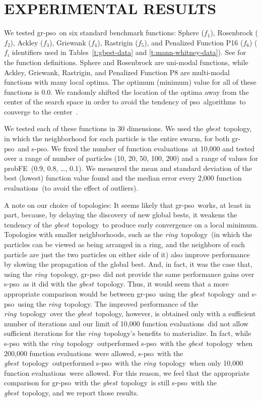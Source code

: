 \documentclass[a4paper,twoside]{article}
\newcommand{\fncevals}{function evaluations}
\newcommand{\fes}{function evaluations}
\newcommand{\pfe}{{probFE}}
\newcommand{\pso}{{\sc pso}}
\newcommand{\spso}{{\sc s-pso}}
\newcommand{\cfe}{{\sc gr-pso}}
\newcommand{\algs}{algorithms}
\newcommand{\gbn}{\emph{gbest}}
\newcommand{\ring}{\emph{ring}}
\newcommand{\topo}{topology}
\begin{document}
\section{\uppercase{Experimental Results}}
\label{s:experiments}

We tested \cfe\ on six standard benchmark functions: Sphere ($f_1$), Rosenbrock ($f_2$), Ackley ($f_3$), Griewank ($f_4$), Rastrigin ($f_5$), and Penalized Function P16 ($f_6$) ($f_i$ identifiers used in Tables~\ref{t:gbest-data} and \ref{t:mann-whitney-data}).  See \cite{bratton07} for the function definitions.
 Sphere and Rosenbrock are uni-modal functions, while Ackley, Griewank, Rastrigin, and Penalized Function P8 are multi-modal functions with many local optima. The optimum (minimum) value for all of these functions is 0.0.
 We randomly shifted the location of the optima away from the center of the search space in order 
to avoid the tendency of \pso\ \algs\ to converge to the center~\cite{monson05}.


We tested each of these functions in 30 dimensions.  We used the \gbn\ \topo, in which the neighborhood for each particle is the entire swarm, for both \cfe\ and \spso. We fixed the number of \fncevals\ at 10,000 and tested over a range of number of particles (10, 20, 50, 100, 200) and a range of values for \pfe\ (0.9, 0.8, \ldots, 0.1).  We measured the mean and standard deviation of the best (lowest) function value found and the median error every 2,000 \fes\ (to avoid the effect of outliers). 

A note on our choice of topologies:  It seems likely that \cfe\ works, at least in part, because, by delaying the discovery of new global bests, it weakens the tendency of the \gbn\ \topo\ to produce early convergence on a local minimum. Topologies with smaller neighborhoods, such as the \ring\ \topo\ (in which the particles can be viewed as being arranged in a ring, and the neighbors of each particle are just the two particles on either side of it) also improve performance by slowing the propagation of the global best. 
And, in fact, it was the case that, using the \ring\ \topo, \cfe\ did not provide the same performance gains over \spso\ as it did with the \gbn\ \topo.  Thus, it would seem that a more appropriate comparison would be between \cfe\ using the \gbn\ \topo\ and \spso\ using the \ring\ \topo. The improved performance of the \ring\ \topo\ over the \gbn\ \topo, however, is obtained only with a sufficient number of iterations and our limit of 10,000 \fncevals\ did not allow sufficient iterations for the \ring\ \topo's benefits to materialize.  In fact, while \spso\ with the \ring\ \topo\ outperformed \spso\ with the \gbn\ \topo\ when 200,000 \fncevals\ were allowed, \spso\ with the \gbn\ \topo\ outperformed \spso\ with the \ring\ \topo\ when only 10,000 \fncevals\ were allowed.  For this reason, we feel that the appropriate comparison for \cfe\ with the \gbn\ \topo\ is still \spso\ with the \gbn\ \topo, and we report those results.
\end{document}

